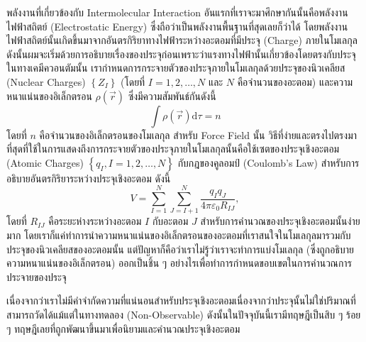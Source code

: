 พลังงานที่เกี่ยวข้องกับ Intermolecular Interaction อันแรกที่เราจะมาศึกษากันนั้นคือพลังงานไฟฟ้าสถิตย์ (Electrostatic Energy) ซึ่งถือว่าเป็นพลังงานพื้นฐานที่สุดเลยก็ว่าได้ โดยพลังงานไฟฟ้าสถิตย์นั้นเกิดขึ้นมาจากอันตรกิริยาทางไฟฟ้าระหว่างอะตอมที่มีประจุ (Charge) ภายในโมเลกุล ดังนั้นผมจะเริ่มด้วยการอธิบายเรื่องของประจุก่อนเพราะว่าแรงทางไฟฟ้านั้นเกี่ยวข้องโดยตรงกับประจุ ในทางเคมีควอนตัมนั้น เรากำหนดการกระจายตัวของประจุภายในโมเลกุลด้วยประจุของนิวเคลียส (Nuclear Charges) $\left\{Z_{I}\right\}$ (โดยที่ $I = 1,2, \ldots, N$ และ $N$ คือจำนวนของอะตอม) และความหนาแน่นของอิเล็กตรอน $\rho(\vec{r})$ ซึ่งมีความสัมพันธ์กันดังนี้
%
\begin{equation}
  \int \rho(\vec{r}) \mathrm{d} \tau
  =
  n
\end{equation}
%
โดยที่ $n$ คือจำนวนของอิเล็กตรอนของโมเลกุล สำหรับ Force Field นั้น วิธีที่ง่ายและตรงไปตรงมาที่สุดที่ใช้ในการแสดงถึงการกระจายตัวของประจุภายในโมเลกุลนั้นคือใช้เซตของประจุเชิงอะตอม (Atomic Charges) $\left\{q_I, I=1,2, \ldots, N\right\}$ กับกฎของคูลอมป์ (Coulomb's Law) สำหรับการอธิบายอันตรกิริยาระหว่างประจุเชิงอะตอม ดังนี้
%
\begin{equation}
  V
  =
  \sum_{I=1}^N \sum_{J=I+1}^N \frac{q_I q_J}{4 \pi \varepsilon_0 R_{I J}},
\end{equation}
%
โดยที่ $R_{I J}$ คือระยะห่างระหว่างอะตอม $I$ กับอะตอม $J$ สำหรับการคำนวณของประจุเชิงอะตอมนั้นง่ายมาก โดยเราก็แค่ทำการนำความหนาแน่นของอิเล็กตรอนของอะตอมที่เราสนใจในโมเลกุลมารวมกับประจุของนิวเคลียสของอะตอมนั้น แต่ปัญหาก็คือว่าเราไม่รู้ว่าเราจะทำการแบ่งโมเลกุล (ซึ่งถูกอธิบายความหนาแน่นของอิเล็กตรอน) ออกเป็นชิ้น ๆ อย่างไรเพื่อทำการกำหนดขอบเขตในการคำนวณการประจายของประจุ

เนื่องจากว่าเราไม่มีคำจำกัดความที่แน่นอนสำหรับประจุเชิงอะตอมเนื่องจากว่าประจุนั้นไม่ใช่ปริมาณที่สามารถวัดได้แม้แต่ในทางทดลอง (Non-Observable) ดังนั้นในปัจจุบันนี้เรามีทฤษฎีเป็นสิบ ๆ ร้อย ๆ ทฤษฎีเลยที่ถูกพัฒนาขึ้นมาเพื่อนิยามและคำนวณประจุเชิงอะตอม

